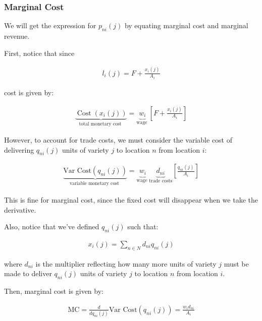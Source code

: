 \documentclass[10pt]{article}
\begin{document}
\subsubsection{Marginal Cost}

We will get the expression 
for $p_{n i}(j)$ by equating 
marginal cost and marginal revenue.

First, notice that since 

\begin{align}
    l_i(j)=F+\frac{x_i(j)}{A_i}
\end{align}

cost is given by:

\begin{align}
    \underbrace{\operatorname{Cost}\left(x_i(j)\right)}_{\text {total monetary cost }}=\underbrace{w_i}_{\text {wage }}\left[F+\frac{x_i(j)}{A_i}\right] \label{eq:cost_xij}
\end{align}

However, to account for trade costs,
we must consider the variable cost of 
delivering $q_{ni}(j)$ units of variety $j$
to location $n$ from location $i$:

\begin{align}
    \underbrace{\text{Var Cost}\left(q_{ni}(j)\right)}_{\text {variable monetary cost }}=\underbrace{w_i}_{\text {wage }} \underbrace{d_{ni}}_{\text{trade costs}} \left[\frac{q_{ni}(j)}{A_i}\right] \label{eq:var_cost_qnij}
\end{align}

This is fine for marginal cost, since the fixed cost 
will disappear when we take the derivative.

Also, notice that we've defined $q_{ni}(j)$ such that:

\begin{align}
    x_i(j) = \sum_{n \in N} d_{ni} q_{ni}(j) \label{eq:xij_qnij}
\end{align}

where $d_{ni}$ is the multiplier reflecting 
how many more units of variety $j$ must be made 
to deliver $q_{ni}(j)$ units of variety $j$ to location $n$
from location $i$.

Then, marginal cost is given by:

\begin{align}
    \text{MC} = \frac{d}{d q_{ni}(j)} \text{Var Cost}\left(q_{ni}(j)\right)= \frac{w_i d_{ni}}{A_i}
\end{align}

\end{document}

